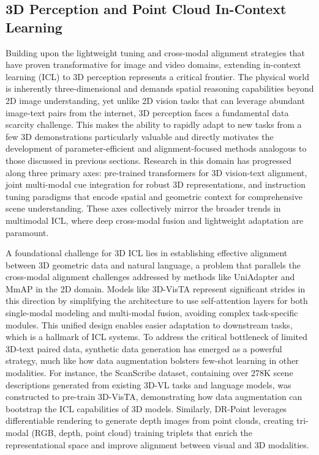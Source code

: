 \documentclass[11pt]{article}
\begin{document}
\subsection{3D Perception and Point Cloud In-Context Learning}

Building upon the lightweight tuning and cross-modal alignment strategies that have proven transformative for image and video domains, extending in-context learning (ICL) to 3D perception represents a critical frontier. The physical world is inherently three-dimensional and demands spatial reasoning capabilities beyond 2D image understanding, yet unlike 2D vision tasks that can leverage abundant image-text pairs from the internet, 3D perception faces a fundamental data scarcity challenge. This makes the ability to rapidly adapt to new tasks from a few 3D demonstrations particularly valuable and directly motivates the development of parameter-efficient and alignment-focused methods analogous to those discussed in previous sections. Research in this domain has progressed along three primary axes: pre-trained transformers for 3D vision-text alignment, joint multi-modal cue integration for robust 3D representations, and instruction tuning paradigms that encode spatial and geometric context for comprehensive scene understanding. These axes collectively mirror the broader trends in multimodal ICL, where deep cross-modal fusion and lightweight adaptation are paramount.

A foundational challenge for 3D ICL lies in establishing effective alignment between 3D geometric data and natural language, a problem that parallels the cross-modal alignment challenges addressed by methods like UniAdapter and MmAP in the 2D domain. Models like 3D-VisTA \cite{ref255} represent significant strides in this direction by simplifying the architecture to use self-attention layers for both single-modal modeling and multi-modal fusion, avoiding complex task-specific modules. This unified design enables easier adaptation to downstream tasks, which is a hallmark of ICL systems. To address the critical bottleneck of limited 3D-text paired data, synthetic data generation has emerged as a powerful strategy, much like how data augmentation bolsters few-shot learning in other modalities. For instance, the ScanScribe dataset, containing over 278K scene descriptions generated from existing 3D-VL tasks and language models, was constructed to pre-train 3D-VisTA, demonstrating how data augmentation can bootstrap the ICL capabilities of 3D models. Similarly, DR-Point \cite{ref256} leverages differentiable rendering to generate depth images from point clouds, creating tri-modal (RGB, depth, point cloud) training triplets that enrich the representational space and improve alignment between visual and 3D modalities.
\end{document}
